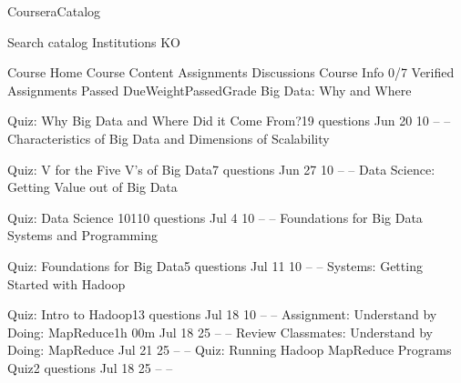 CourseraCatalog

Search catalog
Institutions
KO
 

Course Home
Course Content
Assignments
Discussions
Course Info
0/7
Verified Assignments Passed
DueWeightPassedGrade
Big Data: Why and Where

Quiz: Why Big Data and Where Did it Come From?19 questions
Jun 20
10%
--
--
Characteristics of Big Data and Dimensions of Scalability

Quiz: V for the Five V's of Big Data7 questions
Jun 27
10%
--
--
Data Science: Getting Value out of Big Data

Quiz: Data Science 10110 questions
Jul 4
10%
--
--
Foundations for Big Data Systems and Programming

Quiz: Foundations for Big Data5 questions
Jul 11
10%
--
--
Systems: Getting Started with Hadoop

Quiz: Intro to Hadoop13 questions
Jul 18
10%
--
--
Assignment: Understand by Doing: MapReduce1h 00m
Jul 18
25%
--
--
Review Classmates: Understand by Doing: MapReduce
Jul 21
25%
--
--
Quiz: Running Hadoop MapReduce Programs Quiz2 questions
Jul 18
25%
--
--
